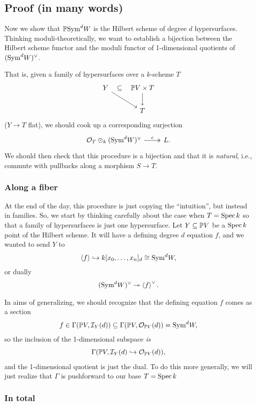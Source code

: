 \documentclass[12pt]{article}
\begin{document}
\subsection{Proof (in many words)}

Now we show that $\P \Sym^d W$ is the Hilbert scheme of degree $d$ hypersurfaces. Thinking moduli-theoretically, we want to establish a bijection between the Hilbert scheme functor and the moduli functor of 1-dimensional quotients of $(\Sym^d W)^\vee$.

That is, given a family of hypersurfaces over a $k$-scheme $T$
\[\begin{tikzcd}
    Y \rar[phantom, sloped, "\subseteq"] \ar[dr] & \P V \times T \dar\\
    & T
\end{tikzcd}\]
($Y\to T$ flat), we should cook up a corresponding surjection
\[\begin{tikzcd}
    \cO_T \otimes_k (\Sym^d W)^\vee \rar[two heads, "e"] & L.
\end{tikzcd}\]
We should then check that this procedure is a bijection and that it is \textit{natural}, i.e., commute with pullbacks along a morphism $S\to T$.


\subsubsection{Along a fiber}

At the end of the day, this procedure is just copying the ``intuition'', but instead in families. So, we start by thinking carefully about the case when $T=\Spec k$ so that a family of hypersurfaces is just one hypersurface. Let $Y\subseteq \P V$ be a $\Spec k$ point of the Hilbert scheme. It will have a defining degree $d$ equation $f$, and we wanted to send $Y$ to
\[\<f\> \hookrightarrow k[x_0,\dots,x_n]_d\cong \Sym^d W,\]
or dually
\[(\Sym^d W)^\vee \twoheadrightarrow \<f\>^\vee.\]

In aims of generalizing, we should recognize that the defining equation $f$ comes as a section
\[f\in \Gamma(\P V, \cI_Y(d))\subseteq \Gamma(\P V, \cO_{\P V}(d))=\Sym^d W,\]
so the inclusion of the 1-dimensional subspace \textit{is}
\[\Gamma(\P V, \cI_Y(d) \hookrightarrow \cO_{\P V}(d)),\]
and the 1-dimensional quotient is just the dual. To do this more generally, we will just realize that $\Gamma$ is pushforward to our base $T=\Spec k$

\subsubsection{In total}
\end{document}
